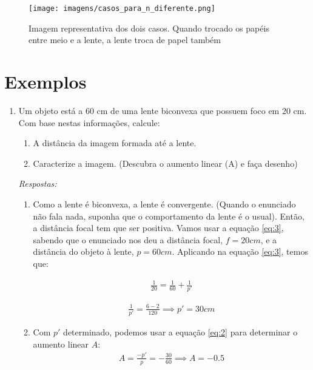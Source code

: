 \documentclass[12pt]{extarticle}
\newcommand{\<}{\langle}
\renewcommand{\>}{\rangle}
\theoremstyle{definition}
\begin{document}
\begin{figure}[H]
    \centering
    \texttt{[image: imagens/casos\_para\_n\_diferente.png]}
    \caption{Imagem representativa dos dois casos. Quando trocado os papéis entre meio e a lente, a lente troca de papel também \cite{fisicaevestibular}}
    \label{fig:casos_p/_n_diferente}
\end{figure}

\section{Exemplos}

\begin{enumerate}
    \item
    Um objeto está a 60 cm de uma lente biconvexa que possuem foco em 20 cm. Com base nestas informações, calcule:
    \begin{enumerate}
        \item 
        A distância da imagem formada até a lente.
        \item
        Caracterize a imagem. (Descubra o aumento linear (A) e faça desenho)
    \end{enumerate}
    
    \textit{Respostas:}
    
    \begin{enumerate}
        \item 
        Como a lente é biconvexa, a lente é convergente. (Quando o enunciado não fala nada, suponha que o comportamento da lente é o usual). Então, a distância focal tem que ser positiva. Vamos usar a equação \ref{eq:3}, sabendo que o enunciado nos deu a distância focal, $f = 20 cm$, e a distância do objeto à lente, $p = 60 cm$. Aplicando na equação \ref{eq:3}, temos que:
        
        \begin{align*}
        \frac{1}{20}= \frac{1}{60} + \frac{1}{p'}
        \end{align*}
        
        \begin{align*}
        \frac{1}{p'}= \frac{6-2}{120} \implies p'=30 cm
        \end{align*}
        
        \item
        Com $p'$ determinado, podemos usar a equação \ref{eq:2} para determinar o aumento linear $A$:
        \begin{align*}
            A = \frac{-p'}{p}= - \frac{30}{60} \implies A = -0.5
        \end{align*}
        

\end{enumerate}
\end{enumerate}
\end{document}
